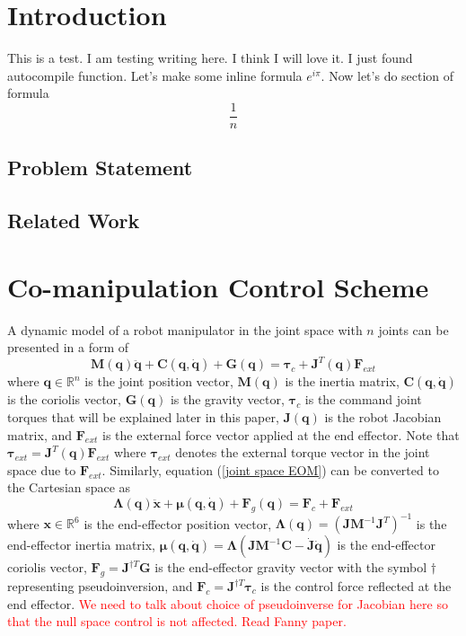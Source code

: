 \documentclass{article}
\newcommand{\M}{\bm{M}}
\newcommand{\q}{\bm{q}}
\newcommand{\qdot}{\dot{\bm{q}}}
\newcommand{\qdotdot}{\ddot{\bm{q}}}
\newcommand{\C}{\bm{C}}
\newcommand{\G}{\bm{G}}
\newcommand{\tauBold}{\bm{\tau}}
\newcommand{\F}{\bm{F}}
\newcommand{\J}{\bm{J}}
\newcommand{\Jdot}{\dot{\bm{J}}}
\newcommand{\LambdaBold}{\bm{\Lambda}}
\newcommand{\x}{\bm{x}}
\newcommand{\xdotdot}{\ddot{\bm{x}}}
\newcommand{\muBold}{\bm{\mu}}
\begin{document}
\section{Introduction}
This is a test. I am testing writing here. I think I will love it. I just found autocompile function.
Let's make some inline formula $e^{i\pi}$.
Now let's do section of formula
$$\frac{1}{n}$$

\subsection{Problem Statement}
\subsection{Related Work}

\section{Co-manipulation Control Scheme}
A dynamic model of a robot manipulator in the joint space with $n$ joints can be presented in a form of
%
\begin{equation}
    \M(\q)\qdotdot+\C(\q,\qdot)+\G(\q)=\tauBold_c+\J^T(\q)\F_{ext}
    \label{joint space EOM}
\end{equation}
%
%
where $\q \in \mathbb{R}^n$ is the joint position vector, $\M(\q)$ is the inertia matrix, $\C(\q,\qdot)$ is the coriolis vector, $\G(\q)$ is the gravity vector, $\tauBold_c$ is the command joint torques that will be explained later in this paper, $\J(\q)$ is the robot Jacobian matrix, and $\F_{ext}$ is the external force vector applied at the end effector. Note that $\tauBold_{ext}=\J^T(\q)\F_{ext}$ where $\tauBold_{ext}$ denotes the external torque vector in the joint space due to $\F_{ext}$. Similarly, equation (\ref{joint space EOM}) can be converted to the Cartesian space as
%
\begin{equation}
    \LambdaBold(\q)\xdotdot+\muBold(\q,\qdot)+\F_g(\q)=\F_c+\F_{ext}
    \label{cartesian space EOM}
\end{equation}
%
%
where $\x \in \mathbb{R}^6$ is the end-effector position vector, $\LambdaBold(\q)=(\J\M^{-1}\J^T)^{-1}$ is the end-effector inertia matrix, $\muBold(\q,\qdot)=\LambdaBold(\J\M^{-1}\C-\Jdot\qdot)$ is the end-effector coriolis vector, $\F_g=\J^{\dagger T}\G$ is the end-effector gravity vector with the symbol $\dagger$ representing pseudoinversion, and $\F_c=\J^{\dagger T}\tauBold_c$ is the control force reflected at the end effector.
\textcolor{red}{We need to talk about choice of pseudoinverse for Jacobian here so that the null space control is not affected. Read Fanny paper.}
\end{document}
